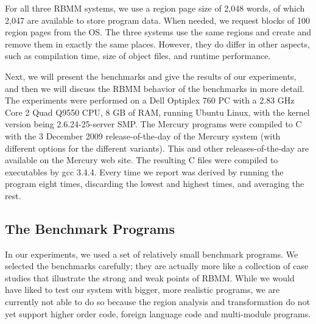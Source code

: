 \documentclass{tlp}
\begin{document}
For all three RBMM systems,
we use a region page size of 2,048 words,
of which 2,047 are available to store program data.
When needed, we request blocks of 100 region pages from the OS.
The three systems use the same regions
and create and remove them in exactly the same places.
However, they do differ in other aspects,
such as compilation time, size of object files, and runtime performance.

Next, we will present the benchmarks and give the results of our experiments,
and then we will discuss the RBMM behavior of the benchmarks in more detail.
The experiments were performed on a Dell Optiplex 760 PC with
a 2.83 GHz Core 2 Quad Q9550 CPU, 8 GB of RAM,
running Ubuntu Linux, with the kernel version being 2.6.24-25-server SMP.
The Mercury programs were compiled to C with
the 3 December 2009 release-of-the-day of the Mercury system
(with different options for the different variants).
This and other releases-of-the-day are available on the Mercury web site.
The resulting C files were compiled to executables by gcc 3.4.4.
Every time we report was derived
by running the program eight times,
discarding the lowest and highest times,
and averaging the rest.

\subsection{The Benchmark Programs}

In our experiments, we used a set of relatively small benchmark programs.
We selected the benchmarks carefully;
they are actually more like a collection of case studies
that illustrate the strong and weak points of RBMM.
While we would have liked to test our system
with bigger, more realistic programs,
we are currently not able to do so
because the region analysis and transformation do not yet support
higher order code, foreign language code and multi-module programs.
\end{document}
